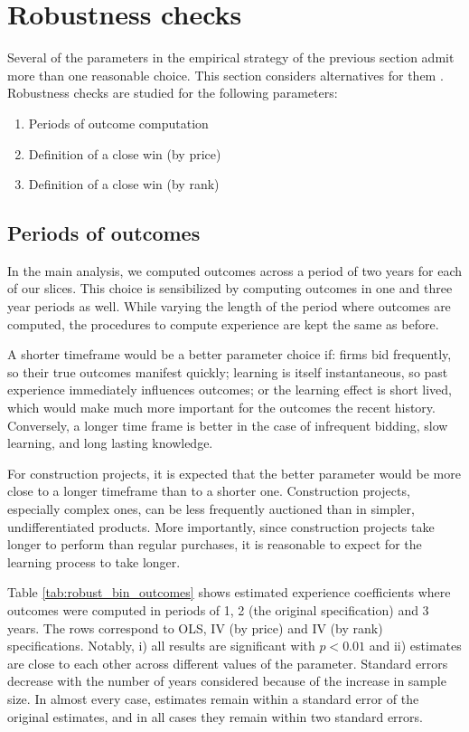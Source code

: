 \section{Robustness checks}
Several of the parameters in the empirical strategy of the previous section admit more than one reasonable choice. This section considers alternatives for them . Robustness checks are studied for the following parameters:
\begin{enumerate}
  \item Periods of outcome computation
  \item Definition of a close win (by price)
  \item Definition of a close win (by rank)
\end{enumerate}
\subsection{Periods of outcomes}
In the main analysis, we computed outcomes across a period of two years for each of our slices. This choice is sensibilized by computing outcomes in one and three year periods as well. While varying the length of the period where outcomes are computed, the procedures to compute experience are kept the same as before.

A shorter timeframe would be a better parameter choice if: firms bid frequently, so their true outcomes manifest quickly;  learning is itself instantaneous,  so past experience immediately influences outcomes; or  the learning effect is short lived, which would make much more important for the outcomes the recent history. Conversely, a longer time frame is better in the case of infrequent bidding, slow learning, and long lasting knowledge.

For construction projects, it is expected that the better parameter would be more close to a longer timeframe than to a shorter one. Construction projects, especially complex ones, can be less frequently auctioned than in simpler, undifferentiated products. More importantly, since construction projects take longer to perform than regular purchases, it is reasonable to expect for the learning process to take longer.

Table \ref{tab:robust_bin_outcomes} shows estimated experience coefficients where outcomes were computed in periods of 1, 2 (the original specification) and 3 years. The rows correspond to OLS, IV (by price) and IV (by rank) specifications. Notably, i) all results are significant with $p<0.01$ and ii) estimates are close to each other across different values of the parameter. Standard errors decrease with the number of years considered because of the increase in sample size. In almost every case, estimates remain within a standard error of the original estimates, and in all cases they remain within two standard errors.


